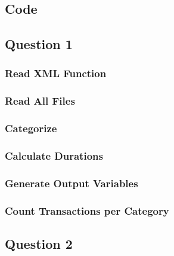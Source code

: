 \documentclass[a4paper,12pt]{article}
\numberwithin{equation}{section}
\numberwithin{figure}{section}
\numberwithin{table}{section}
\begin{document}
\clearpage
\begin{appendices}
\section{Code}
\subsection{Question 1}
\subsubsection{Read XML Function}
\label{readxml}


\newpage
\subsubsection{Read All Files}
\label{readall}


\newpage
\subsubsection{Categorize}
\label{categorize}


\newpage
\subsubsection{Calculate Durations}
\label{duration}


\newpage
\subsubsection{Generate Output Variables}
\label{codes}


\newpage
\subsubsection{Count Transactions per Category}
\label{count}


\newpage
\subsection{Question 2}

\end{appendices}
\end{document}
